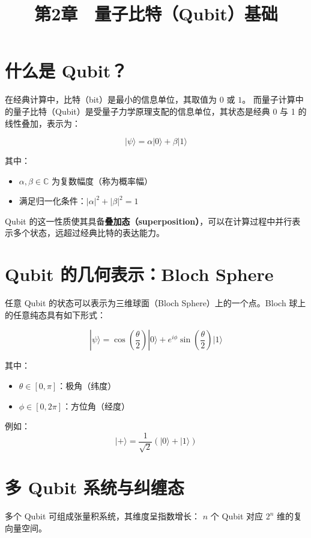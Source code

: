 \documentclass[12pt]{article}
\title{第2章　量子比特（Qubit）基础}
\author{}
\date{}
\begin{document}
\maketitle

\section{什么是 Qubit？}

在经典计算中，比特（bit）是最小的信息单位，其取值为 $0$ 或 $1$。  
而量子计算中的量子比特（Qubit）是受量子力学原理支配的信息单位，其状态是经典 0 与 1 的线性叠加，表示为：

\[
|\psi\rangle = \alpha |0\rangle + \beta |1\rangle
\]

其中：
\begin{itemize}
    \item $\alpha, \beta \in \mathbb{C}$ 为复数幅度（称为概率幅）
    \item 满足归一化条件：$|\alpha|^2 + |\beta|^2 = 1$
\end{itemize}

Qubit 的这一性质使其具备\textbf{叠加态（superposition）}，可以在计算过程中并行表示多个状态，远超过经典比特的表达能力。

\section{Qubit 的几何表示：Bloch Sphere}

任意 Qubit 的状态可以表示为三维球面（Bloch Sphere）上的一个点。Bloch 球上的任意纯态具有如下形式：

\[
|\psi\rangle = \cos\left(\frac{\theta}{2}\right) |0\rangle + e^{i\phi} \sin\left(\frac{\theta}{2}\right) |1\rangle
\]

其中：
\begin{itemize}
    \item $\theta \in [0, \pi]$：极角（纬度）
    \item $\phi \in [0, 2\pi]$：方位角（经度）
\end{itemize}

例如：
\[
|+\rangle = \frac{1}{\sqrt{2}}(|0\rangle + |1\rangle)
\]

\section{多 Qubit 系统与纠缠态}

多个 Qubit 可组成张量积系统，其维度呈指数增长：  
$n$ 个 Qubit 对应 $2^n$ 维的复向量空间。
\end{document}
